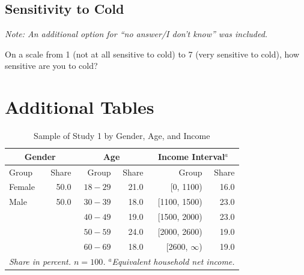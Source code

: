\documentclass[egregdoesnotlikesansseriftitles]{scrartcl}
\begin{document}
\subsection*{Sensitivity to Cold}
\noindent\textit{Note: An additional option for ``no answer/I don't know'' was included.}\vspace{1ex}

\noindent On a scale from 1 (not at all sensitive to cold) to 7 (very sensitive to cold), how sensitive are you to cold? %


\clearpage
\section{Additional Tables}\label{sec:app_additional_tables}

\begin{table}[ht!]
\center
\caption{Sample of Study 1 by Gender, Age, and Income}
\label{tab:quota_study_1}
\begin{tabular}{lrrrrr}\\[0.5ex]
   \hline
   \multicolumn{2}{c}{Gender}   & \multicolumn{2}{c}{Age}   & \multicolumn{2}{c}{Income Interval$^a$}   \\
   \hline
   Group    & Share             & Group	    & Share         & Group              & Share                \\
   \hline\hline
   Female   & 50.0              & $18-29$   & 21.0          &    [0, 1100)       & 16.0                 \\
   Male     & 50.0              & $30-39$   & 18.0          & [1100, 1500)       & 23.0                 \\
   	        &                   & $40-49$   & 19.0          & [1500, 2000)       & 23.0                 \\
   	        &                   & $50-59$   & 24.0          & [2000, 2600)       & 19.0                 \\
   	        &                   & $60-69$   & 18.0          & [2600, $\infty$)   & 19.0                 \\
   \hline
   \multicolumn{6}{p{9cm}}{\footnotesize{\textit{Share in percent. $n=100$. $^a$Equivalent household net income.}}}
\end{tabular}
\end{table}
\end{document}
